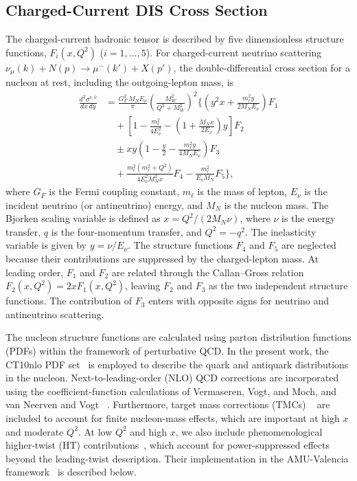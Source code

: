 \documentclass[10pt,twocolumn]{article}
\begin{document}
\subsection{Charged-Current DIS Cross Section}
The charged-current hadronic tensor is described by five dimensionless
structure functions, $F_i(x,Q^2)$ ($i=1,\ldots,5$).
For charged-current neutrino scattering
$\nu_\mu(k) + N(p) \to \mu^-(k') + X(p')$, the double-differential
cross section for a nucleon at rest, including the outgoing-lepton mass,
is~\cite{Haider2011}
\begingroup
\small
\setlength{\jot}{1pt}
\setlength{\abovedisplayskip}{5pt}
\setlength{\belowdisplayskip}{5pt}
\begin{equation}
\begin{aligned}
  \frac{d^2\sigma^{\nu,\bar\nu}}{dx\,dy}
  &= \frac{G_F^2 \,M_N E_\nu}{\pi}\left(\frac{M_W^2}{Q^2+M_W^2}\right)^{\!2}
    \biggl\{
    \left(y^2x+\frac{m_\ell^2y}{2M_NE_\nu}\right)F_1 \\
  &\quad + \left[1-\frac{m_\ell^2}{4E_\nu^2}
    -\left(1+\frac{M_Nx}{2E_\nu}\right)y\right]F_2 \\
  &\quad \pm xy\left(1-\frac{y}{2}
    -\frac{m_\ell^2y}{4M_NE_\nu}\right)F_3 \\
  &\quad +\frac{m_\ell^2(m_\ell^2+Q^2)}
    {4E_\nu^2M_N^2x}F_4
    -\frac{m_\ell^2}{E_\nu M_N}F_5
    \biggr\},
\end{aligned}
  \label{eq:xsec}
\end{equation}
\endgroup
where $G_F$ is the Fermi coupling constant, $m_\ell$ is the
mass of lepton, $E_\nu$ is the incident
neutrino (or antineutrino) energy, and $M_N$ is the nucleon
mass. The Bjorken scaling variable is defined as
$x=Q^2/(2M_N\nu)$, where $\nu$ is the energy transfer,
$q$ is the four-momentum transfer, and $Q^2=-q^2$.
The inelasticity variable is given by $y=\nu/E_\nu$.
The structure functions $F_4$ and $F_5$ are neglected
because their contributions are suppressed by the
charged-lepton mass. At leading order, $F_1$ and $F_2$
are related through the Callan--Gross relation
$F_2(x,Q^2)=2xF_1(x,Q^2)$, leaving $F_2$ and $F_3$
as the two independent structure functions. The
contribution of $F_3$ enters with opposite signs for
neutrino and antineutrino scattering.

The nucleon structure functions are calculated using
parton distribution functions (PDFs) within the framework
of perturbative QCD. In the present work, the CT10nlo
PDF set~\cite{CT10} is employed to describe the
quark and antiquark distributions in the nucleon.
Next-to-leading-order (NLO) QCD corrections are
incorporated using the coefficient-function calculations of
Vermaseren, Vogt, and Moch, and van Neerven and Vogt
~\cite{Vermaseren2005,Moch2009,VanNeervenVogt}. Furthermore, target mass corrections
(TMCs) ~\cite{Schienbein} are included to account for finite nucleon-mass
effects, which are important at high $x$ and moderate $Q^2$.
At low $Q^2$ and high $x$, we also include phenomenological higher-twist
(HT) contributions~\cite{Stein1998,Dasgupta1996}, which account for power-suppressed effects beyond the
leading-twist description. Their implementation in the AMU-Valencia
framework~\cite{Zaidi2020} is
described below.
\end{document}
